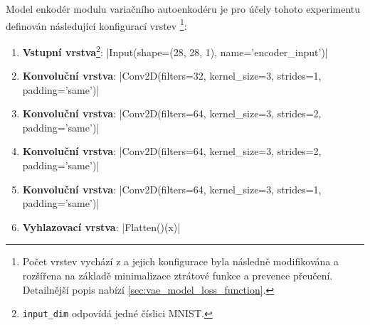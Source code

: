 Model enkodér modulu variačního autoenkodéru je pro účely tohoto experimentu definován následující konfigurací vrstev \footnote{Počet vrstev vychází z \textcite{Kingma2014} a jejich konfigurace byla následně modifikována a rozšířena na základě minimalizace ztrátové funkce a prevence přeučení. Detailnější popis nabízí \autoref{sec:vae_model_loss_function}.}:
\begin{enumerate}
    \item \textbf{Vstupní vrstva}\footnote{\lstinline{input_dim} odpovídá jedné číslici MNIST.}: |Input(shape=(28, 28, 1), name='encoder_input')|
    \item \textbf{Konvoluční vrstva}: |Conv2D(filters=32, kernel_size=3, strides=1, padding='same')|
    \item \textbf{Konvoluční vrstva}: |Conv2D(filters=64, kernel_size=3, strides=2, padding='same')|
    \item \textbf{Konvoluční vrstva}: |Conv2D(filters=64, kernel_size=3, strides=2, padding='same')|
    \item \textbf{Konvoluční vrstva}: |Conv2D(filters=64, kernel_size=3, strides=1, padding='same')|
    \item \textbf{Vyhlazovací vrstva}: |Flatten()(x)|
\end{enumerate}


